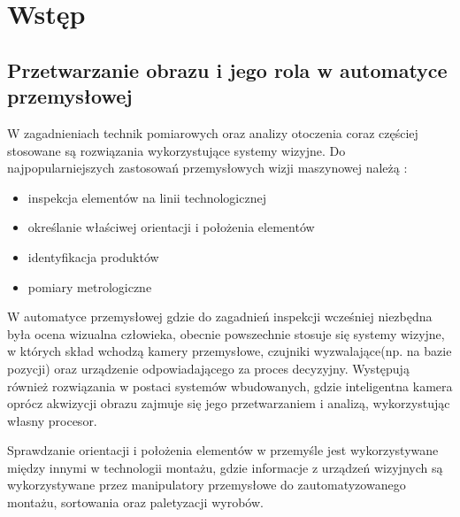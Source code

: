 \documentclass[document.tex]{subfiles}
\begin{document}
\chapter{Wstęp}

\section{Przetwarzanie obrazu i jego rola w automatyce przemysłowej}
	\indent W zagadnieniach technik pomiarowych oraz analizy otoczenia coraz częściej stosowane
	są rozwiązania wykorzystujące systemy wizyjne. Do najpopularniejszych zastosowań przemysłowych wizji maszynowej należą \cite{Machine_Vision_Intro}:
	\begin{itemize}
		\item inspekcja elementów na linii technologicznej
		\item określanie właściwej orientacji i położenia elementów
		\item identyfikacja produktów
		\item pomiary metrologiczne		
	\end{itemize}
	\indent W automatyce przemysłowej gdzie do zagadnień inspekcji
	wcześniej niezbędna była ocena wizualna człowieka, obecnie powszechnie stosuje się systemy wizyjne, 
	w których skład wchodzą kamery przemysłowe, czujniki wyzwalające(np. na bazie pozycji) oraz urządzenie odpowiadającego za proces decyzyjny.
	Występują również rozwiązania w postaci systemów wbudowanych, gdzie inteligentna kamera oprócz
	akwizycji obrazu zajmuje się jego przetwarzaniem i analizą, wykorzystując własny procesor.\cite{Machine_Vision_Intro}\cite{Davies_Machine_Vision}
	


	\indent Sprawdzanie orientacji i położenia elementów w przemyśle jest wykorzystywane
	między innymi w technologii montażu, gdzie informacje z urządzeń wizyjnych są wykorzystywane
	przez manipulatory przemysłowe do zautomatyzowanego montażu, sortowania oraz paletyzacji wyrobów.\cite{Machine_Vision_Intro}
\end{document}
